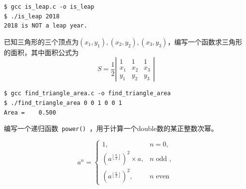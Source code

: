 \begin{frame}
  
\end{frame}

\begin{frame}
\begin{lstlisting}
$ gcc is_leap.c -o is_leap
$ ./is_leap 2018
2018 is NOT a leap year.
\end{lstlisting}
\end{frame}


\begin{frame}
  \begin{biancheng}
    已知三角形的三个顶点为$(x_1,y_1), (x_2, y_2), (x_3, y_3)$，编写一个函数求三角形的面积，其中面积公式为
    $$
    S = \frac12 \left|
      \begin{array}{ccc}
        1&1&1\\
        x_1&x_2&x_3\\
        y_1&y_2&y_3
      \end{array}
    \right|
    $$
  \end{biancheng}
\end{frame}

\begin{frame}
  
\end{frame}

\begin{frame}
\begin{lstlisting}
$ gcc find_triangle_area.c -o find_triangle_area
$ ./find_triangle_area 0 0 1 0 0 1
Area =    0.500
\end{lstlisting}
\end{frame}


\begin{frame}
  \begin{biancheng}
    编写一个递归函数\lstinline| power() |，用于计算一个double数的某正整数次幂。
  \end{biancheng} \pause 

  $$
  a^n = \left\{
    \begin{array}{ll}
      1, & n = 0, \\[.1in]
      \left(a^{\left\lfloor \frac n2 \right\rfloor}\right)^2 \times a, & n \mbox{ odd }, \\[.1in]
      \left(a^{\left\lfloor \frac n2 \right\rfloor}\right)^2 , & n \mbox{ even }
    \end{array}
  \right.
  $$
\end{frame}

